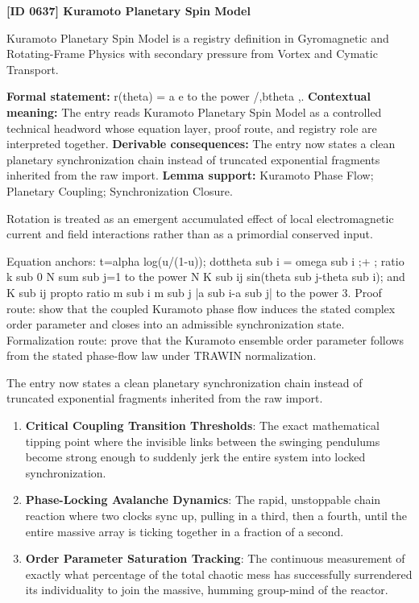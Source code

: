 \clearpage
\noindent\textbf{[ID 0637] Kuramoto Planetary Spin Model}\par
\vspace{0.35em}
\begingroup\small
{}
Kuramoto Planetary Spin Model is a registry definition in Gyromagnetic and Rotating-Frame Physics with secondary pressure from Vortex and Cymatic Transport.

\begingroup\footnotesize\setlength{\emergencystretch}{3em}\sloppy
\textbf{Formal statement:} r(theta) = a e to the power /,btheta ,. \textbf{Contextual meaning:} The entry reads Kuramoto Planetary Spin Model as a controlled technical headword whose equation layer, proof route, and registry role are interpreted together. \textbf{Derivable consequences:} The entry now states a clean planetary synchronization chain instead of truncated exponential fragments inherited from the raw import. \textbf{Lemma support:} Kuramoto Phase Flow; Planetary Coupling; Synchronization Closure.\par
\endgroup

Rotation is treated as an emergent accumulated effect of local electromagnetic current and field interactions rather than as a primordial conserved input.

Equation anchors: t=alpha log(u/(1-u)); dottheta sub i = omega sub i ;+ ; ratio k sub 0 N sum sub j=1 to the power N K sub ij sin(theta sub j-theta sub i); and K sub ij propto ratio m sub i m sub j |a sub i-a sub j| to the power 3. Proof route: show that the coupled Kuramoto phase flow induces the stated complex order parameter and closes into an admissible synchronization state. Formalization route: prove that the Kuramoto ensemble order parameter follows from the stated phase-flow law under TRAWIN normalization.

The entry now states a clean planetary synchronization chain instead of truncated exponential fragments inherited from the raw import.
\endgroup

\begin{enumerate}[leftmargin=1.6em,itemsep=6pt,topsep=4pt]
\item \textbf{Critical Coupling Transition Thresholds}: The exact mathematical tipping point where the invisible links between the swinging pendulums become strong enough to suddenly jerk the entire system into locked synchronization.
\item \textbf{Phase-Locking Avalanche Dynamics}: The rapid, unstoppable chain reaction where two clocks sync up, pulling in a third, then a fourth, until the entire massive array is ticking together in a fraction of a second.
\item \textbf{Order Parameter Saturation Tracking}: The continuous measurement of exactly what percentage of the total chaotic mess has successfully surrendered its individuality to join the massive, humming group-mind of the reactor.
\end{enumerate}

